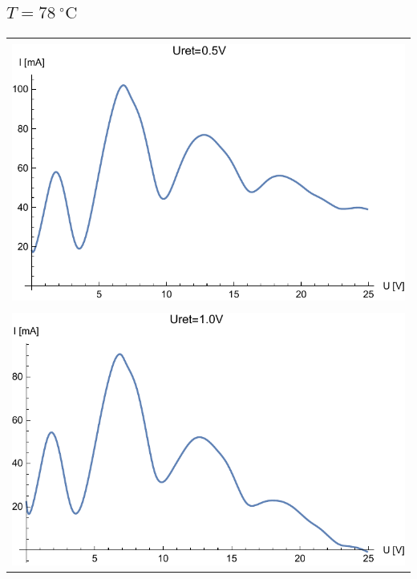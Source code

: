 \documentclass[paper=a4, fontsize=12pt]{scrartcl}
\begin{document}
{\subsection{$T=78\:^\circ\mathrm{C}$}{

\begin{tabular}{|c|}
	\hline\\	
	\includegraphics[width=0.625\linewidth]{wyk12}
	\label{fig:wyk12}\\
	\hline\\
	\includegraphics[width=0.625\linewidth]{wyk13}
	\label{fig:wyk13}\\
	\hline
\end{tabular}

}}
\end{document}
